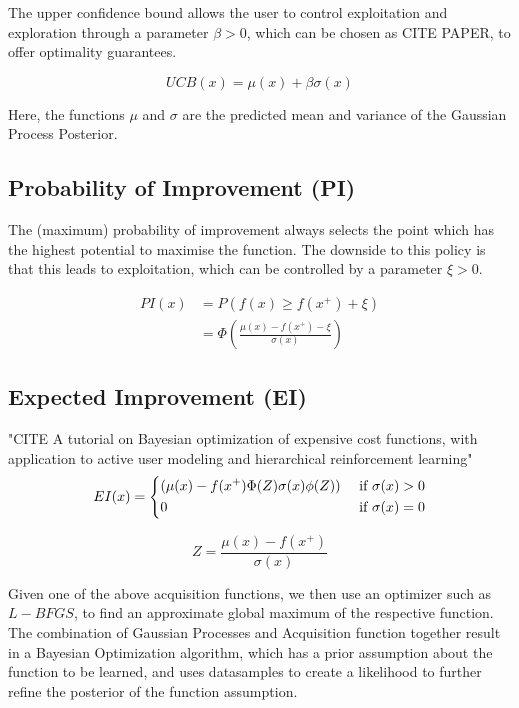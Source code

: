 The upper confidence bound allows the user to control exploitation and exploration through a parameter $\beta > 0$, which can be chosen as CITE PAPER, to offer optimality guarantees.

\begin{equation}
UCB(x) = \mu(x) + \beta \sigma(x)
\end{equation}

Here, the functions $\mu$ and $\sigma$ are the predicted mean and variance of the Gaussian Process Posterior.

\subsection{Probability of Improvement (PI)}
The (maximum) probability of improvement always selects the point which has the highest potential to maximise the function. 
The downside to this policy is that this leads to exploitation, which can be controlled by a parameter $\xi > 0$.

\begin{align}
    PI(x) & = P( f(x) \geq f(x^+) + \xi ) \\
    & = \Phi ( \frac{\mu(x) - f(x^+) - \xi}{\sigma(x)}  ) 
\end{align}


\subsection{Expected Improvement (EI)}

"CITE A tutorial on Bayesian optimization of expensive cost functions, with application to active user modeling and hierarchical reinforcement learning"
\begin{align}
    EI(x) =
    \begin{dcases}
        ( \mu (x) - f(x^+) \Phi(Z) \sigma (x) \phi (Z) ) & \text{ if } \sigma (x) > 0 \\
        0 & \text{ if } \sigma (x) = 0
    \end{dcases} \\
\end{align}

\begin{equation}
    Z = \frac{\mu (x) - f(x^+) }{\sigma(x)}
\end{equation}

Given one of the above acquisition functions, we then use an optimizer such as $L-BFGS$, to find an approximate global maximum of the respective function.
The combination of Gaussian Processes and Acquisition function together result in a Bayesian Optimization algorithm, which has a prior assumption about the function to be learned, and uses datasamples to create a likelihood to further refine the posterior of the function assumption.

